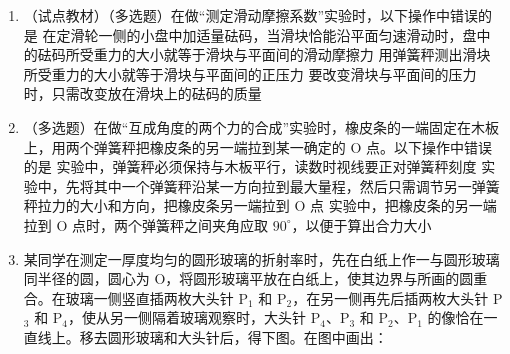 \documentclass[\gkver]{gaokaozhenti}
\begin{document}
\begin{enumerate}
\item
（试点教材）（多选题）在做“测定滑动摩擦系数”实验时，以下操作中错误的是
\onepicture[align=right, w=5cm]{}
{在定滑轮一侧的小盘中加适量砝码，当滑块恰能沿平面匀速滑动时，盘中的砝码所受重力的大小就等于滑块与平面间的滑动摩擦力}
{用弹簧秤测出滑块所受重力的大小就等于滑块与平面间的正压力}
{要改变滑块与平面间的压力时，只需改变放在滑块上的砝码的质量}

\item
（多选题）在做“互成角度的两个力的合成”实验时，橡皮条的一端固定在木板上，用两个弹簧秤把橡皮条的另一端拉到某一确定的 O 点。以下操作中错误的是
{实验中，弹簧秤必须保持与木板平行，读数时视线要正对弹簧秤刻度}
{实验中，先将其中一个弹簧秤沿某一方向拉到最大量程，然后只需调节另一弹簧秤拉力的大小和方向，把橡皮条另一端拉到 O 点}
{实验中，把橡皮条的另一端拉到 O 点时，两个弹簧秤之间夹角应取 $90^{\circ}$，以便于算出合力大小}

\item
某同学在测定一厚度均匀的圆形玻璃的折射率时，先在白纸上作一与圆形玻璃同半径的圆，圆心为 O，将圆形玻璃平放在白纸上，使其边界与所画的圆重合。在玻璃一侧竖直插两枚大头针 P$_{1}$ 和 P$_{2}$，在另一侧再先后插两枚大头针 P$_{3}$ 和 P$_{4}$，使从另一侧隔着玻璃观察时，大头针 P$_{4}$、P$_{3}$ 和 P$_{2}$、P$_{1}$ 的像恰在一直线上。移去圆形玻璃和大头针后，得下图。在图中画出：
\onepicture[align=right, w=5cm]{}
\end{enumerate}
\end{document}

